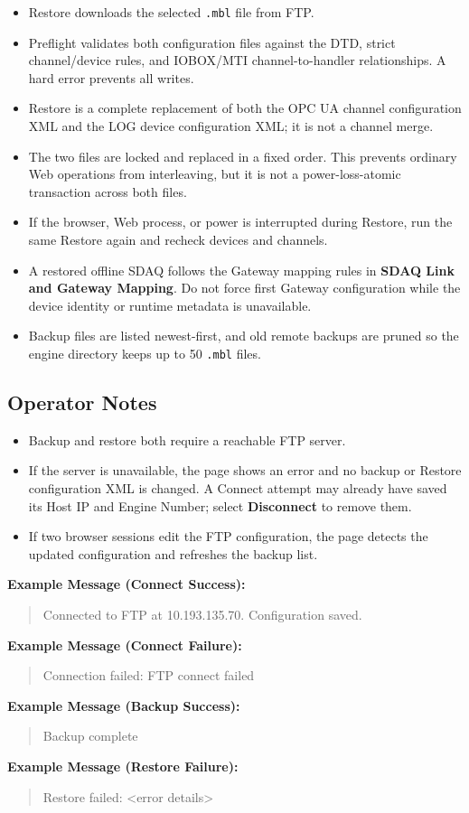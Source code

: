\documentclass[11pt,a4paper]{article}
\newcommand{\messageexample}[2]{%
\noindent\textbf{Example Message (#1):}\\%
\begin{quote}\raggedright #2\end{quote}%
}
\begin{document}
\begin{itemize}
\item Restore downloads the selected \texttt{.mbl} file from FTP.
\item Preflight validates both configuration files against the DTD, strict channel/device rules, and IOBOX/MTI channel-to-handler relationships. A hard error prevents all writes.
\item Restore is a complete replacement of both the OPC UA channel configuration XML and the LOG device configuration XML; it is not a channel merge.
\item The two files are locked and replaced in a fixed order. This prevents ordinary Web operations from interleaving, but it is not a power-loss-atomic transaction across both files.
\item If the browser, Web process, or power is interrupted during Restore, run the same Restore again and recheck devices and channels.
\item A restored offline SDAQ follows the Gateway mapping rules in \textbf{SDAQ Link and Gateway Mapping}. Do not force first Gateway configuration while the device identity or runtime metadata is unavailable.
\item Backup files are listed newest-first, and old remote backups are pruned so the engine directory keeps up to 50 \texttt{.mbl} files.
\end{itemize}

\subsection{Operator Notes}
\begin{itemize}
\item Backup and restore both require a reachable FTP server.
\item If the server is unavailable, the page shows an error and no backup or Restore configuration XML is changed. A Connect attempt may already have saved its Host IP and Engine Number; select \textbf{Disconnect} to remove them.
\item If two browser sessions edit the FTP configuration, the page detects the updated configuration and refreshes the backup list.
\end{itemize}

\messageexample{Connect Success}{Connected to FTP at 10.193.135.70. Configuration saved.}
\messageexample{Connect Failure}{Connection failed: FTP connect failed}
\messageexample{Backup Success}{Backup complete}
\messageexample{Restore Failure}{Restore failed: <error details>}
\end{document}
